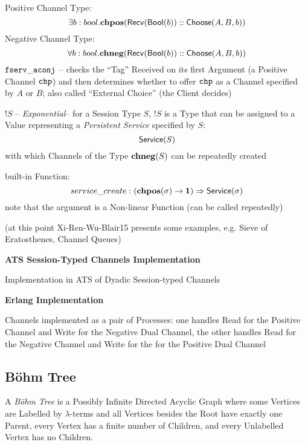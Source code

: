 Positive Channel Type:
\[
  \exists b : bool. \mathbf{chpos}(\mathsf{Recv}(\mathsf{Bool}(b)) :: \mathsf{Choose}(A,B,b))
\]
Negative Channel Type:
\[
  \forall b : bool. \mathbf{chneg}(\mathsf{Recv}(\mathsf{Bool}(b)) :: \mathsf{Choose}(A,B,b))
\]
$\mathtt{fserv\_aconj}$ -- checks the ``Tag'' Received on its first
Argument (a Positive Channel $\mathtt{chp}$) and then determines whether
to offer $\mathtt{chp}$ as a Channel specified by $A$ or $B$; also
called ``External Choice'' (the Client decides)

$!S$ -- \emph{Exponential}-- for a Session Type $S$, $!S$ is a Type
that can be assigned to a Value representing a \emph{Persistent
  Service} specified by $S$:
\[
  \mathsf{Service}(S)
\]
with which Channels of the Type $\mathbf{chneg}(S)$ can be repeatedly created

built-in Function:
\[
  service\_create :
    (\mathbf{chpos}(\sigma) \rightarrow \mathbf{1}) \Rightarrow \mathsf{Service}(\sigma)
\]
note that the argument is a Non-linear Function (can be called
repeatedly)

(at this point Xi-Ren-Wu-Blair15 presents some examples, e.g. Sieve of
Eratosthenes, Channel Queues)


\textbf{ATS Session-Typed Channels Implementation}

Implementation in ATS of Dyadic Session-typed Channels


\textbf{Erlang Implementation}

Channels implemented as a pair of Processes: one handles Read for the
Positive Channel and Write for the Negative Dual Channel, the other
handles Read for the Negative Channel and Write for the for the
Positive Dual Channel %


\endgroup



\subsection{B\"ohm Tree}\label{sec:bohm_tree}

A \emph{B\"ohm Tree} is a Possibly Infinite Directed Acyclic Graph
where some Vertices are Labelled by $\lambda$-terms and all Vertices
besides the Root have exactly one Parent, every Vertex has a finite
number of Children, and every Unlabelled Vertex has no Children.



